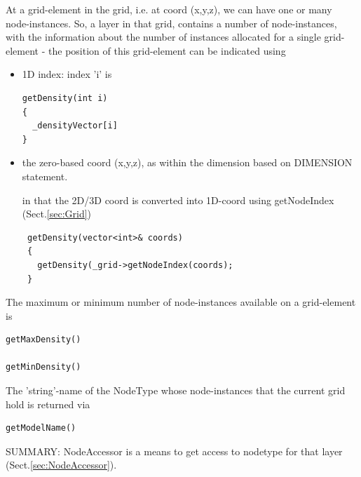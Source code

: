 At a grid-element in the grid, i.e. at coord (x,y,z), we can have one or many
node-instances. So, a layer in that grid, contains a number of node-instances,
with the information about the number of instances allocated for a single
grid-element - the position of this grid-element can be indicated using
\begin{itemize}
  \item 1D index: index 'i' is
\begin{verbatim}
getDensity(int i)
{
  _densityVector[i]
}
\end{verbatim}

  \item the zero-based coord (x,y,z), as within the dimension based on DIMENSION
  statement.
  
 in that the 2D/3D coord is converted into 1D-coord using getNodeIndex
 (Sect.\ref{sec:Grid})
 \begin{verbatim}
 getDensity(vector<int>& coords)
 {
   getDensity(_grid->getNodeIndex(coords);
 }
 \end{verbatim}
\end{itemize}
The maximum or minimum number of node-instances available on a grid-element is
\begin{verbatim}
getMaxDensity()

getMinDensity()

\end{verbatim}
The 'string'-name of the NodeType whose node-instances that the current grid
hold is returned via 
\begin{verbatim}
getModelName()
\end{verbatim}


SUMMARY: NodeAccessor is a means to get access to nodetype for that layer
(Sect.\ref{sec:NodeAccessor}).

